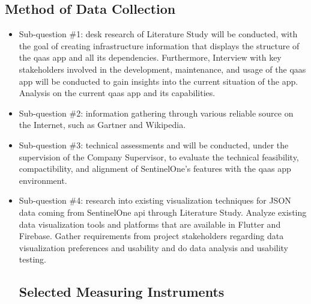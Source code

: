 \subsection{Method of Data Collection}
\begin{itemize}[label=-]
      \item Sub-question \#1: desk research of Literature Study will be conducted, with the goal of creating
            infrastructure information that displays the structure of the \acrshort{qaas} app and all its
            dependencies. Furthermore, Interview with key stakeholders involved in the  development, maintenance,
            and usage of the \acrshort{qaas} app will be conducted to gain insights into the current situation
            of the app. Analysis on the current \acrshort{qaas} app and its capabilities.
      \item Sub-question \#2: information gathering through various reliable source on the Internet, such as
            Gartner and Wikipedia.
      \item Sub-question \#3: technical assessments and will be conducted, under the supervision of the Company
            Supervisor, to evaluate the technical feasibility, compactibility, and alignment of SentinelOne's
            features with the \acrshort{qaas} app environment.
      \item Sub-question \#4: research into existing visualization techniques for \gls{JSON} data coming from
            SentinelOne \acrshort{api} through Literature Study. Analyze existing data visualization tools and
            platforms that are available in Flutter and Firebase. Gather requirements from project stakeholders
            regarding data visualization preferences and usability and do data analysis and usability testing.
            \subsection{Selected Measuring Instruments}
\end{itemize}
